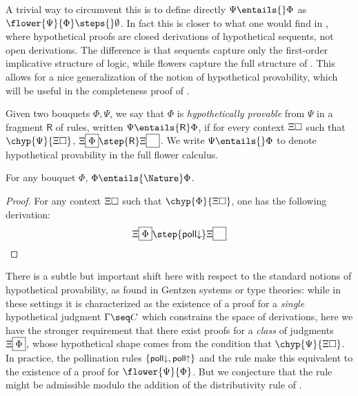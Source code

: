 A trivial way to circumvent this is to define directly $\Psi \entails{} \Phi$ as
$\flower{\Psi}{\Phi} \steps{} \emptyset$. In fact this is closer to what one would
find in , where hypothetical proofs are closed derivations of
hypothetical sequents, not open derivations. The difference is that sequents
capture only the first-order implicative structure of logic, while flowers
capture the full structure of  . This allows for a
nice generalization of the notion of hypothetical provability, which will be
useful in the completeness proof of . 

\begin{definition}
  Given two bouquets $\Phi, \Psi$, we say that $\Phi$ is \emph{hypothetically
  provable} from $\Psi$ in a fragment $\mathsf{R}$ of rules, written $\Psi
  \entails{\mathsf{R}} \Phi$, if for every context $\Xi\square$ such that
  $\chyp{\Psi}{\Xi\hole}$, $\cfill{\Xi}{\Phi} \step{\mathsf{R}}
  \cfill{\Xi}{\phantom{\Phi}}$. We write $\Psi \entails{} \Phi$ to denote
  hypothetical provability in the full flower calculus.
\end{definition}

\begin{lemma}[Reflexivity]
  For any bouquet $\Phi$, $\Phi \entails{\Nature} \Phi$.
\end{lemma}
\begin{proof}
  For any context $\Xi\square$ such that $\chyp{\Phi}{\Xi\hole}$, one has the following
  derivation:
  $$
  \cfill{\Xi}{\Phi} \step{\mathsf{poll{\da}}}
  \cfill{\Xi}{\phantom{\Phi}}
  $$
\end{proof}

There is a subtle but important shift here with respect to the standard notions
of hypothetical provability, as found in Gentzen systems or type theories: while
in these settings it is characterized as the existence of a proof for a
\emph{single} hypothetical judgment $\Gamma \seq C$ which constrains the space
of derivations, here we have the stronger requirement that there exist proofs
for a \emph{class} of judgments $\Xi\fbox{$\Phi$}$, whose hypothetical shape
comes from the condition that $\chyp{\Psi}{\Xi\hole}$. In practice, the
pollination rules $\{\text{\text{\small$\mathsf{poll{\downarrow}}$}}, \text{\text{\small$\mathsf{poll{\uparrow}}$}}\}$ and
the {} rule make this equivalent to the existence of a proof for
$\flower{\Psi}{\Phi}$. But we conjecture that the {} rule might be
admissible modulo the addition of the distributivity rule
 of .

